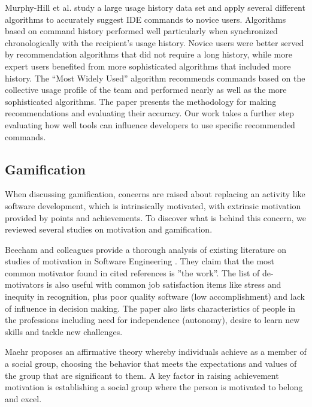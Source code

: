 \documentclass{sig-alternate}
\begin{document}
Murphy-Hill et al. study a large usage history data set and apply several different algorithms to accurately suggest IDE commands to novice users\cite{MurphyHill2012Improving}.  Algorithms based on command history performed well particularly when synchronized chronologically with the recipient's usage history. Novice users were better served by recommendation algorithms that did not require a long history, while more expert users benefited from more sophisticated algorithms that included more history. The ``Most Widely Used'' algorithm recommends commands based on the collective usage profile of the team and performed nearly as well as the more sophisticated algorithms. The paper presents the methodology for making recommendations and evaluating their accuracy. Our work takes a further step evaluating how well tools can influence developers to use specific recommended commands.

\subsection{Gamification}

When discussing gamification, concerns are raised about replacing an activity like software development, which is intrinsically motivated, with extrinsic motivation provided by points and achievements.  To discover what is behind this concern, we reviewed several studies on motivation and gamification. 

Beecham and colleagues provide a thorough analysis of existing literature on studies of motivation in Software Engineering \cite{Beecham2008Motivation}.  They claim that the most common motivator found in cited references is ''the work''. The list of de-motivators is also useful with common job satisfaction items like stress and inequity in recognition, plus poor quality software (low accomplishment) and lack of influence in decision making. The paper also lists characteristics of people in the professions including need for independence (autonomy), desire to learn new skills and tackle new challenges. 

Maehr proposes an affirmative theory whereby individuals achieve as a member of a social group, choosing the behavior that meets the expectations and values of the group that are significant to them\cite{wbsnipes:MaehrCulture}.  A key factor in raising achievement motivation is establishing a social group where the person is motivated to belong and excel.  %
\end{document}
